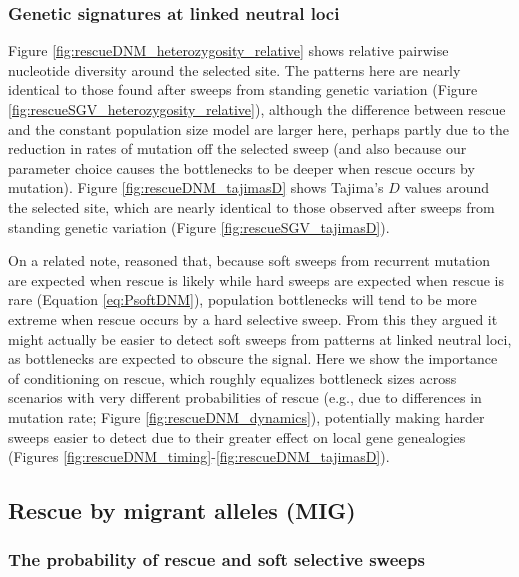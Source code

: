 \documentclass[]{article}
\begin{document}
\subsubsection*{Genetic signatures at linked neutral loci}

Figure \ref{fig:rescueDNM_heterozygosity_relative} shows relative pairwise nucleotide diversity around the selected site.
The patterns here are nearly identical to those found after sweeps from standing genetic variation (Figure \ref{fig:rescueSGV_heterozygosity_relative}), although the difference between rescue and the constant population size model are larger here, perhaps partly due to the reduction in rates of mutation off the selected sweep (and also because our parameter choice causes the bottlenecks to be deeper when rescue occurs by mutation).
Figure \ref{fig:rescueDNM_tajimasD} shows Tajima's $D$ values around the selected site, which are nearly identical to those observed after sweeps from standing genetic variation (Figure \ref{fig:rescueSGV_tajimasD}).

On a related note, \cite{wilson2017soft} reasoned that, because soft sweeps from recurrent mutation are expected when rescue is likely while hard sweeps are expected when rescue is rare (Equation \ref{eq:PsoftDNM}), population bottlenecks will tend to be more extreme when rescue occurs by a hard selective sweep.
From this they argued it might actually be easier to detect soft sweeps from patterns at linked neutral loci, as bottlenecks are expected to obscure the signal.
Here we show the importance of conditioning on rescue, which roughly equalizes bottleneck sizes across scenarios with very different probabilities of rescue (e.g., due to differences in mutation rate; Figure \ref{fig:rescueDNM_dynamics}), potentially making harder sweeps easier to detect due to their greater effect on local gene genealogies (Figures \ref{fig:rescueDNM_timing}-\ref{fig:rescueDNM_tajimasD}).

\subsection*{Rescue by migrant alleles (MIG)}
\label{sec:rescue_forward_mig_main}

\subsubsection*{The probability of rescue and soft selective sweeps}
\end{document}
